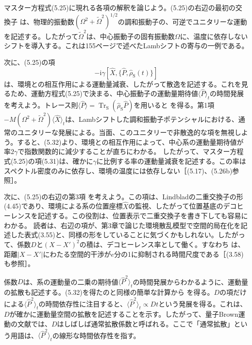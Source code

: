 マスター方程式(5.25)に現れる各項の解釈を論じよう。(5.25)の右辺の最初の交換子
は、物理的振動数$(\Omega^2+\widetilde\Omega^2)^{1/2}$の調和振動子の、可逆でユニタリーな運動を記述する。したがって$\widetilde\Omega^2$は、中心振動子の固有振動数$\Omega$に、温度に依存しないシフトを導入する。これは155ページで述べたLambシフトの寄与の一例である。

次に、(5.25)の項
\begin{equation}-\mathrm i\gamma[\hat X,\{\hat P,\hat\rho_{\mathrm S}(t)\}]\tag{5.31}\end{equation}
は、環境との相互作用による運動量減衰、したがって散逸を記述する。これを見るため、運動方程式(5.25)で決まる、中心振動子の運動量期待値$\langle\hat P\rangle_t$の時間発展を考えよう。トレース則$\langle\hat P\rangle=\operatorname{Tr}_{\mathrm S}(\hat\rho_{\mathrm S}\hat P)$を用いると
を得る。第1項$-M(\Omega^2+\widetilde\Omega^2)\langle\hat X\rangle_t$は、Lambシフトした調和振動子ポテンシャルにおける、通常のユニタリーな発展による。当面、このユニタリーで非散逸的な項を無視しよう。すると、(5.32)より、環境との相互作用によって、中心系の運動量期待値が率$2\gamma$で指数関数的に減少することが直ちにわかる。
したがって、マスター方程式(5.25)の項(5.31)は、確かに$\gamma$に比例する率の運動量減衰を記述する。この率はスペクトル密度のみに依存し、環境の温度には依存しない［(5.17)、(5.26b)参照］。

\hypertarget{srcpage:185}{}\label{srcpage:185}
次に、(5.25)の右辺の第3項
を考えよう。この項は、Lindbladの二重交換子の形(4.45)であり、環境による系の位置座標$\hat X$の監視、したがって位置基底のデコヒーレンスを記述する。この役割は、位置表示で二重交換子を書き下しても容易にわかる。
読者は、右辺の項が、第3章で論じた環境散乱模型で空間的局在化を記述した表式(3.55)と、同様の形をしていることに気づくかもしれない。したがって、係数$D$と$(X-X')^2$の積は、デコヒーレンス率として働く。すなわち
は、距離$|X-X'|$にわたる空間的干渉が$e$分の1に抑制される時間尺度である［(3.58)も参照］。

係数$D$は、系の運動量の二乗の期待値$\langle\hat P^2\rangle_t$の時間発展からわかるように、運動量の拡散も記述する。(5.32)を得たのと同様の簡単な計算から
を得る。$D$の項だけによる$\langle\hat P^2\rangle_t$の時間依存性に注目すると、$\langle\hat P^2\rangle_t\propto Dt$という発展を得る。これは、$D$が確かに運動量空間の拡散を記述することを示す。したがって、量子Brown運動の文献では、$D$はしばしば通常拡散係数と呼ばれる。ここで「通常拡散」という用語は、$\langle\hat P^2\rangle_t$の線形な時間依存性を指す。

